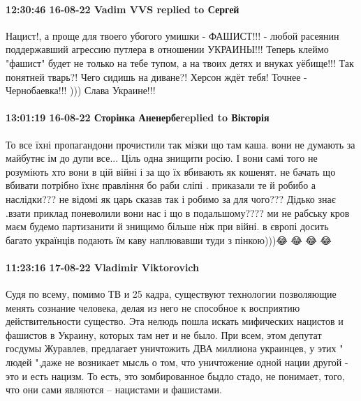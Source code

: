  
 
 
 
 

\paragraph{12:30:46 16-08-22 Vadim VVS replied to Сергей}

Нацист!, а проще для твоего убогого умишки - ФАШИСТ!!! - любой расеянин
поддержавший агрессию путлера в отношении УКРАИНЫ!!! Теперь клеймо "фашист"
будет не только на тебе тупом, а на твоих детях и внуках уёбище!!! Так понятней
тварь?! Чего сидишь на диване?! Херсон ждёт тебя! Точнее - Чернобаевка!!! )))
Слава Украине!!!

\paragraph{13:01:19 16-08-22 Сторінка Аненербеreplied to Вікторія}

То все їхні пропагандони прочистили так мізки що там каша. вони не думають за
майбутнє ім до дупи все... Ціль одна знищити росію. І вони самі того не
розуміють хто вони в цій війні і за що їх вбивають як кошенят. не бачать що
вбивати потрібно їхнє правління бо раби сліпі . приказали те й робибо а
наслідки??? не відомі як царь сказав так і робимо за для чого??? Дідько знає
.взати приклад поневолили вони нас і що в подальшому???? ми не рабську кров
маєм будемо партизанити й знищимо більше ніж при війні. в європі досить багато
українців подають їм каву наплювавши туди з пінкою)))😂 😂 😂 😂

\paragraph{11:23:16 17-08-22 Vladimir Viktorovich}

Судя по всему, помимо ТВ и 25 кадра, существуют технологии позволяющие менять сознание человека, делая из него не способное к восприятию действительности существо. Эта нелюдь пошла искать мифических нацистов и
фашистов в Украину, которых там нет и не было.                         При всем, этом депутат госдумы Журавлев,  предлагает уничтожить ДВА миллиона украинцев, у этих " людей ",даже не возникает мысль о том, что уничтожение одной нации другой - это и есть нацизм. То есть, это зомбированное быдло стадо, не понимает, того, что они сами являются – нацистами и фашистами.
